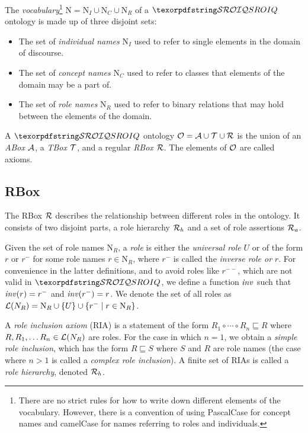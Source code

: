 
The \emph{vocabulary}\footnote{There are no strict rules for how to write down different elements of the vocabulary. However, there is a convention of using PascalCase for concept names and camelCase for names referring to roles and individuals.} $\mathrm{N} = \mathrm{N}_I \cup \mathrm{N}_C \cup \mathrm{N}_R$ of a $\SROIQ$ ontology is made up of three disjoint sets:
\begin{itemize}
    \item The set of \emph{individual names} $\mathrm{N}_I$ used to refer to single elements in the domain of discourse.
    \item The set of \emph{concept names} $\mathrm{N}_C$ used to refer to classes that elements of the domain may be a part of.
    \item The set of \emph{role names} $\mathrm{N}_R$ used to refer to binary relations that may hold between the elements of the domain.
\end{itemize}
A $\SROIQ$ ontology $\mathcal{O} = \mathcal{A} \cup \mathcal{T} \cup \mathcal{R}$ is the union of an \emph{ABox} $\mathcal{A}$, a \emph{TBox} $\mathcal{T}$, and a regular \emph{RBox} $\mathcal{R}$. The elements of $\mathcal{O}$ are called axioms.

\subsection{RBox} \label{rbox}

The RBox $\mathcal{R}$ describes the relationship between different roles in the ontology. It consists of two disjoint parts, a role hierarchy $\mathcal{R}_h$ and a set of role assertions $\mathcal{R}_a$.

Given the set of role names $\mathrm{N}_R$, a \emph{role} is either the \emph{universal role} $U$ or of the form $r$ or $r^-$ for some role names $r \in \mathrm{N}_R$, where $r^-$ is called the \emph{inverse role or} $r$. For convenience in the latter definitions, and to avoid roles like $r^{--}$, which are not valid in $\SROIQ$, we define a function $\mathit{inv}$ such that $\mathit{inv}(r) = r^-$ and $\mathit{inv}(r^-) = r$. We denote the set of all roles as $\mathcal{L}(N_R) = \mathrm{N}_R \cup \{ U \} \cup \{ r^- \mid r \in \mathrm{N}_R \}$.

A \emph{role inclusion axiom} (RIA) is a statement of the form $R_1 \circ \cdots \circ R_n \sqsubseteq R$ where $R, R_1, \dots R_n \in \mathcal{L}(N_R)$ are roles. For the case in which $n = 1$, we obtain a \emph{simple role inclusion}, which has the form $R \sqsubseteq S$ where $S$ and $R$ are role names (the case where $n > 1$ is called a \emph{complex role inclusion}). A finite set of RIAs is called a \emph{role hierarchy}, denoted $\mathcal{R}_h$.

